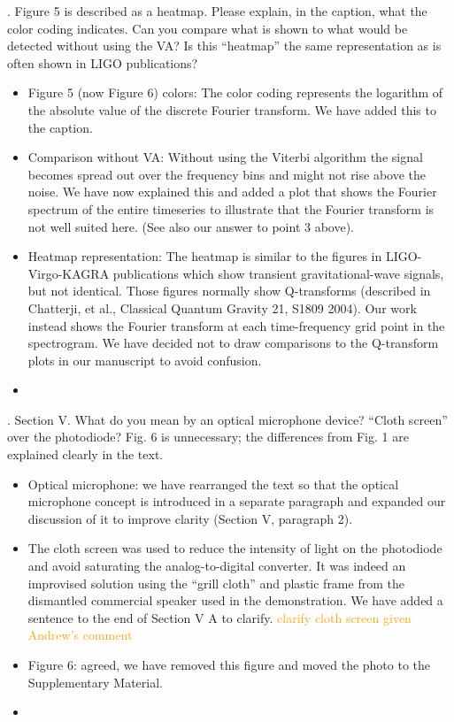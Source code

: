 \documentclass{article}
\newcommand{\han}{\textcolor{orange}}
\begin{document}
. Figure 5 is described as a heatmap.  Please explain, in the caption, what the color coding indicates.  Can you compare what is shown to what would be detected without using the VA?  Is this ``heatmap'' the same representation as is often shown in LIGO publications?
\begin{itemize}
\item Figure 5 (now Figure 6) colors: The color coding represents the logarithm of the absolute value of the discrete Fourier transform. We have added this to the caption.
\item Comparison without VA: Without using the Viterbi algorithm the signal becomes spread out over the frequency bins and might not rise above the noise. We have now explained this and added a plot that shows the Fourier spectrum of the entire timeseries to illustrate that the Fourier transform is not well suited here. (See also our answer to point 3 above).
\item Heatmap representation: The heatmap is similar to the figures in LIGO-Virgo-KAGRA publications which show transient gravitational-wave signals, but not identical. Those figures normally show Q-transforms (described in Chatterji, et al., Classical Quantum Gravity 21, S1809 2004). Our work instead shows the Fourier transform at each time-frequency grid point in the spectrogram. We have decided not to draw comparisons to the Q-transform plots in our manuscript to avoid confusion.
\item[]
\end{itemize}


. Section V.  What do you mean by an optical microphone device?  “Cloth screen” over the photodiode?  Fig. 6 is unnecessary; the differences from Fig. 1 are explained clearly in the text.
\begin{itemize}
\item Optical microphone: we have rearranged the text so that the optical microphone concept is introduced in a separate paragraph and expanded our discussion of it to improve clarity (Section V, paragraph 2).
\item The cloth screen was used to reduce the intensity of light on the photodiode and avoid saturating the analog-to-digital converter. It was indeed an improvised solution using the ``grill cloth'' and plastic frame from the dismantled commercial speaker used in the demonstration. We have added a sentence to the end of Section V A to clarify. \han{clarify cloth screen given Andrew's comment}
\item Figure 6: agreed, we have removed this figure and moved the photo to the Supplementary Material.
\item []
\end{itemize}  
\end{document}
